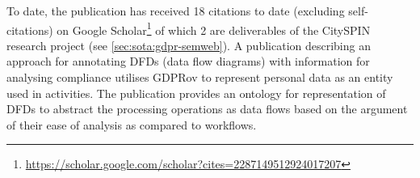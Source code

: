 To date, the publication has received 18 citations to date (excluding self-citations) on Google Scholar\footnote{\url{https://scholar.google.com/scholar?cites=2287149512924017207}} of which 2 are deliverables of the CitySPIN research project (see \autoref{sec:sota:gdpr-semweb}).
A publication describing an approach for annotating DFDs (data flow diagrams) with information for analysing compliance \cite{debruyneOntologyRepresentingAnnotating2019}  utilises GDPRov to represent personal data as an entity used in activities. The publication provides an ontology for representation of DFDs to abstract the processing operations as data flows based on the argument of their ease of analysis as compared to workflows.

